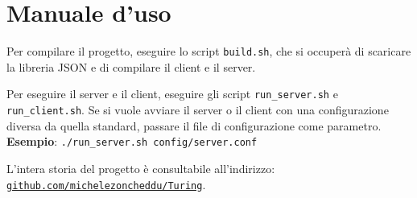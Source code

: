 \section{Manuale d'uso}
Per compilare il progetto, eseguire lo script \texttt{build.sh}, che si occuperà di scaricare la libreria JSON e di compilare il client e il server.

\medskip

Per eseguire il server e il client, eseguire gli script \texttt{run\_server.sh} e \texttt{run\_client.sh}. Se si vuole avviare il server o il client con una configurazione diversa da quella standard, passare il file di configurazione come parametro. \\
\textbf{Esempio}: \texttt{./run\_server.sh config/server.conf}

\medskip

L'intera storia del progetto è consultabile all'indirizzo: \\
\href{https://github.com/michelezoncheddu/Turing}{\texttt{github.com/michelezoncheddu/Turing}}.
